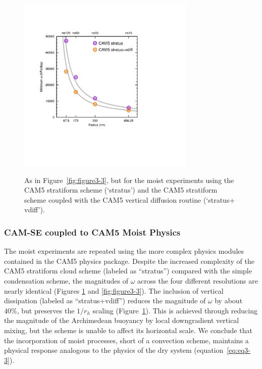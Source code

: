 \begin{figure}
\begin{center}
\noindent\includegraphics[width=20pc,angle=0]{chapter3/Figure5_crop.pdf}\\
\end{center}
\caption{As in Figure~\ref{fig:figure3-3}, but for the moist experiments using the CAM5 stratiform scheme (‘stratus’) and the CAM5 stratiform scheme coupled with the CAM5 vertical diffusion routine (‘stratus$+$vdiff’).}
\label{fig:figure3-5}
\end{figure}

\subsubsection{CAM-SE coupled to CAM5 Moist Physics}
The moist experiments are repeated using the more complex physics modules contained in the CAM5 physics package. Despite the increased complexity of the CAM5 stratiform cloud scheme (labeled as “stratus”) compared with the simple condensation scheme, the magnitudes of $\omega$ across the four different resolutions are nearly identical (Figures \ref{fig:figure3-5} and \ref{fig:figure3-3}). The inclusion of vertical dissipation (labeled as “stratus+vdiff”) reduces the magnitude of $\omega$ by about 40\%, but preserves the $1/r_h$ scaling (Figure~\ref{fig:figure3-5}). This is achieved through reducing the magnitude of the Archimedean buoyancy by local downgradient vertical mixing, but the scheme is unable to affect its horizontal scale. We conclude that the incorporation of moist processes, short of a convection scheme, maintains a physical response analogous to the physics of the dry system (equation~\ref{eq:eq3-3}).

